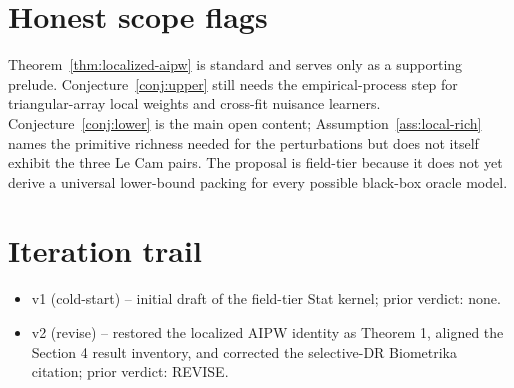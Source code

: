 \documentclass[11pt]{article}
\theoremstyle{definition}
\theoremstyle{plain}
\theoremstyle{remark}
\begin{document}
\section{Honest scope flags}
Theorem~\ref{thm:localized-aipw} is standard and serves only as a supporting prelude. Conjecture~\ref{conj:upper} still needs the empirical-process step for triangular-array local weights and cross-fit nuisance learners. Conjecture~\ref{conj:lower} is the main open content; Assumption~\ref{ass:local-rich} names the primitive richness needed for the perturbations but does not itself exhibit the three Le Cam pairs. The proposal is field-tier because it does not yet derive a universal lower-bound packing for every possible black-box oracle model.

\section{Iteration trail}
\begin{itemize}[leftmargin=*]
\item v1 (cold-start) -- initial draft of the field-tier Stat kernel; prior verdict: none.
\item v2 (revise) -- restored the localized AIPW identity as Theorem 1, aligned the Section 4 result inventory, and corrected the selective-DR Biometrika citation; prior verdict: REVISE.
\end{itemize}
\end{document}
